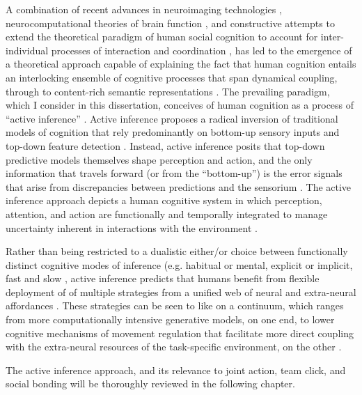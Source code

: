 \begin{CJK}{UTF8}{gbsn}
A combination of recent advances in neuroimaging technologies \citep{Frith2007}, neurocomputational theories of brain function \citep{Friston2010,Frith2010,Yufik2013,Clark2013}, and constructive attempts to extend the theoretical paradigm of human social cognition to account for inter-individual processes of interaction and coordination \citep{Sebanz2006,Dale2014}, has led to the emergence of a theoretical approach capable of explaining the fact that human cognition entails an interlocking ensemble of cognitive processes that span dynamical coupling, through to content-rich semantic representations \citep{Roepstorff2011,Ramstead2016}.  The prevailing paradigm, which I consider in this dissertation, conceives of human cognition as a process of ``active inference'' \citep{Friston2010}.  Active inference \citep[and the predictive coding paradigm which it extends, see][]{Clark2013} proposes a radical inversion of traditional models of cognition that rely predominantly on bottom-up sensory inputs and top-down feature detection \citep{Marr1985}. Instead, active inference posits that top-down predictive models themselves shape perception and action, and the only information that travels forward (or from the ``bottom-up'') is the error signals that arise from discrepancies between predictions and the sensorium \citep{Clark2015}.  The active inference approach depicts a human cognitive system in which perception, attention, and action are functionally and temporally integrated to manage uncertainty inherent in interactions with the environment \citep{Clark2013}.

Rather than being restricted to a dualistic either/or choice between functionally distinct cognitive modes of inference (e.g. habitual or mental, explicit or implicit, fast and slow \citep[cf.][]{Dienes1999,Kahneman2011}, active inference predicts that humans benefit from flexible deployment of of multiple strategies from a unified web of neural and extra-neural affordances \citep{Pezzulo2013,Clark2015}.  These strategies can be seen to like on a continuum, which ranges from more computationally intensive generative models, on one end, to lower cognitive mechanisms of movement regulation that facilitate more direct coupling with the extra-neural resources of the task-specific environment, on the other \citep{Riley2011}.

The active inference approach, and its relevance to joint action, team click, and social bonding will be thoroughly reviewed in the following chapter.


\end{CJK}
